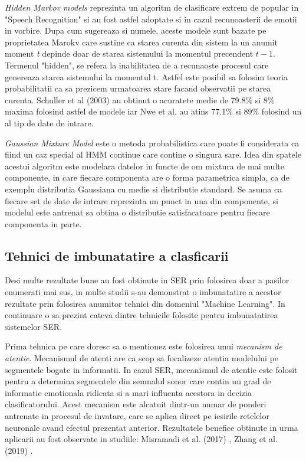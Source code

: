 \documentclass[a4paper,12pt, twoside]{book}
\begin{document}
							\textit{Hidden Markov models} reprezinta un algoritm de clasificare extrem de popular in "Speech Recognition" si au fost astfel adoptate si in cazul recunoasterii de emotii in vorbire. Dupa cum sugereaza si numele, aceste modele sunt bazate pe proprietatea Marokv care sustine ca starea curenta din sistem la un anumit moment \textit{t} depinde doar de starea sistemului la momentul precendent \(t-1\). Termenul "hidden", se refera la inabilitatea de a recunaoste procesul care genereaza starea sistemului la momentul t. Astfel este posibil sa folosim teoria probabilitatii ca sa prezicem urmatoarea stare facand observatii pe starea curenta. Schuller et al (2003) au obtinut o acuratete medie de 79.8\% si 8\% maxima folosind astfel de modele iar Nwe et al. au atins 77.1\% si 89\% folosind un al tip de date de intrare. \par
													
							\textit{Gaussian Mixture Model} este o metoda probabilistica care poate fi considerata ca fiind un caz special al HMM continue care contine o singura sare. Idea din spatele acestui algoritm este modelara datelor in functe de om mixtura de mai multe componente, in care fiecare componenta are o forma parametrica simpla, ca de exemplu distributia Gaussiana cu medie si distributie standard. Se asuma ca fiecare set de date de intrare reprezinta un punct in una din componente, si modelul este antrenat sa obtina o distributie satisfacatoare pentru fiecare componenta in parte. \par
						\fi
					\subsection{Tehnici de imbunatatire a clasficarii}
						Desi multe rezultate bune au fost obtinute in SER prin folosirea doar a pasilor enumerati mai sus, in multe studii s-au demonstrat o imbunatatire a acestor rezultate prin folosirea anumitor tehnici din domeniul "Machine Learning". In continuare o sa prezint cateva dintre tehnicile folosite pentru imbunatatirea sistemelor SER.
						
						Prima tehnica pe care doresc sa o mentionez este folosirea unui \textit{mecanism de atentie}. Mecanismul de atenti are ca scop sa focalizeze atentia modelului pe segmentele bogate in informatii. In cazul SER, mecanismul de atentie este folosit pentru a determina segmentele din semnalul sonor care contin un grad de informatie emotionala ridicata si a mari influenta acestora in decizia clasificatorului. Acest mecanism este alcatuit dintr-un numar de ponderi antrenate in procesul de invatare, care se aplica direct pe iesirile retelelor neuronale avand efectul prezentat anterior.  Rezultatele benefice obtinute in urma aplicarii au fost observate in studiile: Misramadi et al. (2017) \cite{misramadi}, Zhang et al. (2019) \cite{zhang} . \par
						
\end{document}
